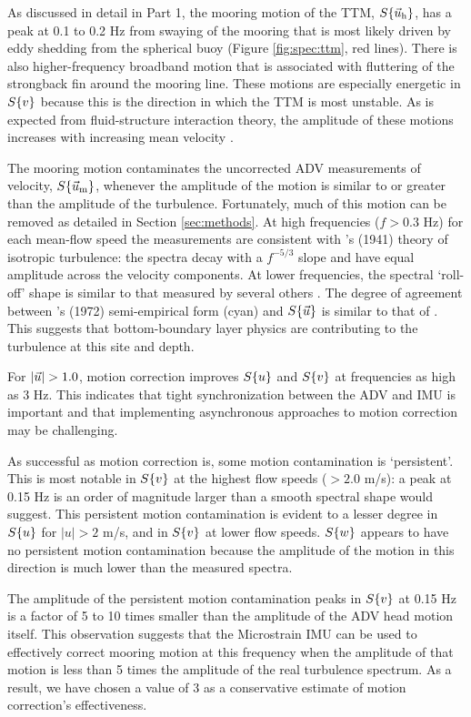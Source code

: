 As discussed in detail in Part 1, the mooring motion of the TTM, $S\{\vec{u}_{\mathrm{h}}\}$, has a peak at 0.1 to 0.2 Hz from swaying of the mooring that is most likely driven by eddy shedding from the spherical buoy (Figure \ref{fig:spec:ttm}, red lines). There is also higher-frequency broadband motion that is associated with fluttering of the strongback fin around the mooring line. These motions are especially energetic in $S\{v\}$ because this is the direction in which the TTM is most unstable. As is expected from fluid-structure interaction theory, the amplitude of these motions increases with increasing mean velocity \cite[]{Morison++1950}.

The mooring motion contaminates the uncorrected ADV measurements of velocity, $S\{\vec{u}_{\mathrm{m}}\}$, whenever the amplitude of the motion is similar to or greater than the amplitude of the turbulence. Fortunately, much of this motion can be removed as detailed in Section \ref{sec:methods}. At high frequencies ($f>0.3$ Hz) for each mean-flow speed the measurements are consistent with \citeauthor{Kolmogorov1941c}'s (1941) theory of isotropic turbulence: the spectra decay with a $f^{-5/3}$ slope and have equal amplitude across the velocity components. At lower frequencies, the spectral `roll-off' shape is similar to that measured by several others \cite[e.g.,][]{Thomson++2012, McMillan++2016}. The degree of agreement between \citeauthor{Kaimal++1972}'s (1972) semi-empirical form (cyan) and $S\{\vec{u}\}$ is similar to that of \cite{Walter++2011}. This suggests that bottom-boundary layer physics are contributing to the turbulence at this site and depth.

For $|\ue|>1.0$, motion correction improves $S\{u\}$ and $S\{v\}$ at frequencies as high as 3 Hz. This indicates that tight synchronization between the ADV and IMU is important and that implementing asynchronous approaches to motion correction may be challenging.

As successful as motion correction is, some motion contamination is `persistent'. This is most notable in $S\{v\}$ at the highest flow speeds ($>2.0$ m/s): a peak at 0.15 Hz is an order of magnitude larger than a smooth spectral shape would suggest. This persistent motion contamination is evident to a lesser degree in $S\{u\}$ for $|u|>2$ m/s, and in $S\{v\}$ at lower flow speeds.  $S\{w\}$ appears to have no persistent motion contamination because the amplitude of the motion in this direction is much lower than the measured spectra.

The amplitude of the persistent motion contamination peaks in $S\{v\}$ at 0.15 Hz is a factor of 5 to 10 times smaller than the amplitude of the ADV head motion itself. This observation suggests that the Microstrain IMU can be used to effectively correct mooring motion at this frequency when the amplitude of that motion is less than 5 times the amplitude of the real turbulence spectrum. As a result, we have chosen a value of 3 as a conservative estimate of motion correction's effectiveness.

